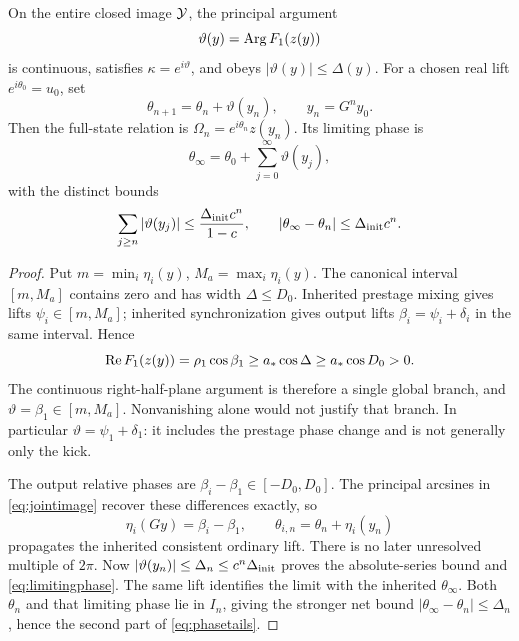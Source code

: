 \begin{theorem}\label{thm:phasebranch}
On the entire closed image \(\mathcal Y\), the principal argument
\begin{equation}
\vartheta(y)=\operatorname{Arg} F_1(z(y))
\label{eq:vartheta}
\end{equation}
is continuous, satisfies \(\kappa=e^{i\vartheta}\), and obeys \(|\vartheta(y)|\le\Delta(y)\). For a chosen real lift \(e^{i\theta_0}=u_0\), set
\begin{equation}
\theta_{n+1}=\theta_n+\vartheta(y_n),\qquad y_n=G^ny_0.
\label{eq:reallift}
\end{equation}
Then the full-state relation is \(\Omega_n=e^{i\theta_n}z(y_n)\). Its limiting phase is
\begin{equation}
\theta_\infty=\theta_0+\sum_{j=0}^\infty\vartheta(y_j),
\label{eq:limitingphase}
\end{equation}
with the distinct bounds
\begin{equation}
\sum_{j\ge n}|\vartheta(y_j)|\le\frac{\Delta_{\rm init}c^n}{1-c},
\qquad |\theta_\infty-\theta_n|\le\Delta_{\rm init}c^n.
\label{eq:phasetails}
\end{equation}
\end{theorem}
\begin{proof}
Put \(m=\min_i\eta_i(y)\), \(M_a=\max_i\eta_i(y)\). The canonical interval \([m,M_a]\) contains zero and has width \(\Delta\le D_0\). Inherited prestage mixing gives lifts \(\psi_i\in[m,M_a]\); inherited synchronization gives output lifts \(\beta_i=\psi_i+\delta_i\) in the same interval. Hence
\begin{equation}
\operatorname{Re} F_1(z(y))=\rho_1\cos\beta_1
\ge a_*\cos\Delta\ge a_*\cos D_0>0.
\label{eq:anchorhalfplane}
\end{equation}
The continuous right-half-plane argument is therefore a single global branch, and \(\vartheta=\beta_1\in[m,M_a]\). Nonvanishing alone would not justify that branch. In particular \(\vartheta=\psi_1+\delta_1\): it includes the prestage phase change and is not generally only the kick.

The output relative phases are \(\beta_i-\beta_1\in[-D_0,D_0]\). The principal arcsines in \eqref{eq:jointimage} recover these differences exactly, so
\begin{equation}
\eta_i(Gy)=\beta_i-\beta_1,\qquad \theta_{i,n}=\theta_n+\eta_i(y_n)
\label{eq:ordinarychannels}
\end{equation}
propagates the inherited consistent ordinary lift. There is no later unresolved multiple of \(2\pi\). Now \(|\vartheta(y_n)|\le\Delta_n\le c^n\Delta_{\rm init}\) proves the absolute-series bound and \eqref{eq:limitingphase}. The same lift identifies the limit with the inherited \(\theta_\infty\). Both \(\theta_n\) and that limiting phase lie in \(I_n\), giving the stronger net bound \(|\theta_\infty-\theta_n|\le\Delta_n\), hence the second part of \eqref{eq:phasetails}.
\end{proof}

